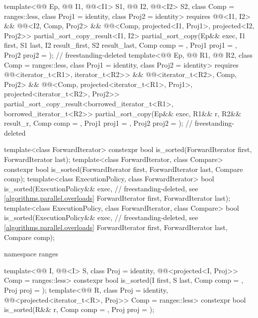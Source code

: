 \begin{codeblock}
{{    template<@@ Ep, @@ I1, @@<I1> S1,
             @@ I2, @@<I2> S2,
             class Comp = ranges::less, class Proj1 = identity, class Proj2 = identity>
      requires @@<I1, I2> && @@<I2, Comp, Proj2> &&
               @@<Comp, projected<I1, Proj1>, projected<I2, Proj2>>
      partial_sort_copy_result<I1, I2>
        partial_sort_copy(Ep&& exec, I1 first, S1 last, I2 result_first, S2 result_last,
                          Comp comp = {}, Proj1 proj1 = {},
                          Proj2 proj2 = {});                    // freestanding-deleted
    template<@@ Ep, @@ R1, @@ R2,
             class Comp = ranges::less, class Proj1 = identity, class Proj2 = identity>
      requires @@<iterator_t<R1>, iterator_t<R2>> &&
               @@<iterator_t<R2>, Comp, Proj2> &&
               @@<Comp, projected<iterator_t<R1>, Proj1>,
                                          projected<iterator_t<R2>, Proj2>>
      partial_sort_copy_result<borrowed_iterator_t<R1>, borrowed_iterator_t<R2>>
        partial_sort_copy(Ep&& exec, R1&& r, R2&& result_r, Comp comp = {},
                          Proj1 proj1 = {}, Proj2 proj2 = {});  // freestanding-deleted
  }

  template<class ForwardIterator>
    constexpr bool is_sorted(ForwardIterator first, ForwardIterator last);
  template<class ForwardIterator, class Compare>
    constexpr bool is_sorted(ForwardIterator first, ForwardIterator last,
                             Compare comp);
  template<class ExecutionPolicy, class ForwardIterator>
    bool is_sorted(ExecutionPolicy&& exec,                      // freestanding-deleted, see \ref{algorithms.parallel.overloads}
                   ForwardIterator first, ForwardIterator last);
  template<class ExecutionPolicy, class ForwardIterator, class Compare>
    bool is_sorted(ExecutionPolicy&& exec,                      // freestanding-deleted, see \ref{algorithms.parallel.overloads}
                   ForwardIterator first, ForwardIterator last,
                   Compare comp);

  namespace ranges {
    template<@@ I, @@<I> S, class Proj = identity,
             @@<projected<I, Proj>> Comp = ranges::less>
      constexpr bool is_sorted(I first, S last, Comp comp = {}, Proj proj = {});
    template<@@ R, class Proj = identity,
             @@<projected<iterator_t<R>, Proj>> Comp = ranges::less>
      constexpr bool is_sorted(R&& r, Comp comp = {}, Proj proj = {});

}}
\end{codeblock}
